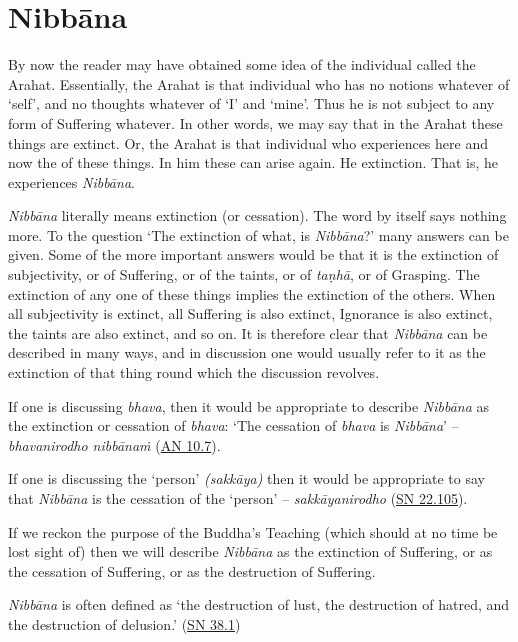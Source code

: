 \chapter{Nibbāna}

By now the reader may have obtained some idea of the individual called the Arahat. Essentially, the Arahat is that individual who has no notions whatever of `self', and no thoughts whatever of `I' and `mine'. Thus he is not subject to any form of Suffering whatever. In other words, we may say that in the Arahat these things are extinct. Or, the Arahat is that individual who experiences here and now the  of these things. In him these can  arise again. He  extinction. That is, he experiences \emph{Nibbāna}.

\emph{Nibbāna} literally means extinction (or cessation). The word by itself says nothing more. To the question `The extinction of what, is \emph{Nibbāna}?' many answers can be given. Some of the more important answers would be that it is the extinction of subjectivity, or of Suffering, or of the taints, or of \emph{taṇhā}, or of Grasping. The extinction of any one of these things implies  the extinction of the others. When all subjectivity is extinct, all Suffering is also extinct, Ignorance is also extinct, the taints are also extinct, and so on. It is therefore clear that \emph{Nibbāna} can be described in many ways, and in discussion one would usually refer to it as the extinction of that thing round which the discussion revolves.

If one is discussing \emph{bhava}, then it would be appropriate to describe \emph{Nibbāna} as the extinction or cessation of \emph{bhava}: `The cessation of \emph{bhava} is \emph{Nibbāna}' -- \emph{bhavanirodho nibbānaṁ} (\href{https://suttacentral.net/an10.7/en/bodhi}{AN 10.7}).

If one is discussing the `person' \emph{(sakkāya)} then it would be appropriate to say that \emph{Nibbāna} is the cessation of the `person' -- \emph{sakkāyanirodho} (\href{https://suttacentral.net/sn22.105/en/sujato}{SN 22.105}).

If we reckon the purpose of the Buddha's Teaching (which should at no time be lost sight of) then we will describe \emph{Nibbāna} as the extinction of Suffering, or as the cessation of Suffering, or as the destruction of Suffering.

\emph{Nibbāna} is often defined as `the destruction of lust, the destruction of hatred, and the destruction of delusion.' (\href{https://suttacentral.net/sn38.1/en/sujato}{SN 38.1})

